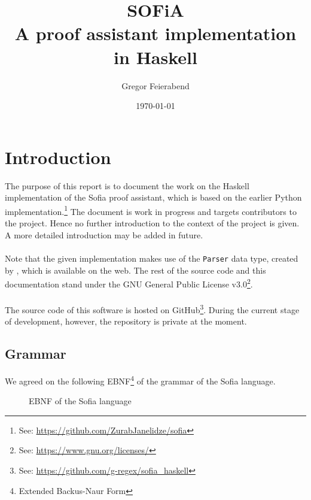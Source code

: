 \documentclass[notitlepage]{report}
\title{SOFiA\\
\large A proof assistant implementation in Haskell}
\author{Gregor Feierabend}
\date{\today}
\newcommand\m[1]{\texttt{#1}}
\begin{document}

\maketitle

\begingroup
\let\clearpage\relax
\tableofcontents
\endgroup

\chapter{Introduction}
The purpose of this report is to document the work on the Haskell
implementation of the Sofia proof assistant, which is based on the earlier
Python implementation.\footnote{See: %
\url{https://github.com/ZurabJanelidze/sofia}}
The document is work in progress and targets contributors to the project. Hence
no further introduction to the context of the project is given. A more detailed
introduction may be added in future.
\\\\
Note that the given implementation makes use of the \m{Parser} data type,
created by \textcite{Hutton}, which is available on the web. The rest of the
source code and this documentation stand under the GNU General Public License
v3.0\footnote{See: \url{https://www.gnu.org/licenses/}}.
\\\\
The source code of this software is hosted on
GitHub\footnote{See: \url{https://github.com/g-regex/sofia_haskell}}. During the
current stage of development, however, the repository is private at the moment.


\section{Grammar}
We agreed on the following EBNF\footnote{Extended Backus-Naur Form} of the
grammar of the Sofia language.
\begin{figure}[h!]
    {\renewcommand{\arraystretch}{2.0}
    }
    \caption{EBNF of the Sofia language}\label{fig:EBNFsofia}
\end{figure}
\end{document}
